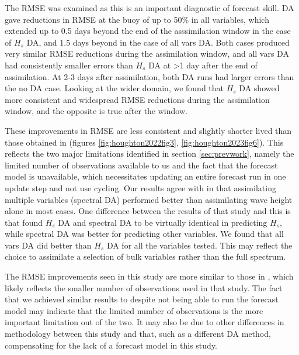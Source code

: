 The RMSE was examined as this is an important diagnostic of forecast skill. DA gave reductions in RMSE at the buoy of up to 50\% in all variables, which extended up to 0.5 days beyond the end of the asssimilation window in the case of $H_s$ DA, and 1.5 days beyond in the case of all vars DA. Both cases produced very similar RMSE reductions during the assimilation window, and all vars DA had consistently smaller errors than $H_s$ DA at >1 day after the end of assimilation. At 2-3 days after assimilation, both DA runs had larger errors than the no DA case. Looking at the wider domain, we found that $H_s$ DA showed more consistent and widespread RMSE reductions during the assimilation window, and the opposite is true after the window.%

These improvements in RMSE are less consistent and slightly shorter lived than those obtained in \cite{Houghton2022,Houghton2023} (figures \ref{fig:houghton2022fig3}, \ref{fig:houghton2023fig6}). This reflects the two major limitations identified in section \ref{sec:prevwork}, namely the limited number of observations available to us and the fact that the forecast model is unavailable, which necessitates updating an entire forecast run in one update step and not use cycling. Our results agree with \cite{Houghton2022} in that assimilating multiple variables (spectral DA) performed better than assimilating wave height alone in most cases. One difference between the results of that study and this is that \cite{Houghton2022} found $H_s$ DA and spectral DA to be virtually identical in predicting $H_s$, while spectral DA was better for predicting other variables. We found that all vars DA did better than $H_s$ DA for all the variables tested. This may reflect the choice to assimilate a selection of bulk variables rather than the full spectrum.

The RMSE improvements seen in this study are more similar to those in \cite{Caires2018}, which likely reflects the smaller number of observations used in that study. The fact that we achieved similar results to \cite{Caires2018} despite not being able to run the forecast model may indicate that the limited number of observations is the more important limitation out of the two. It may also be due to other differences in methodology between this study and that, such as a different DA method, compensating for the lack of a forecast model in this study.

